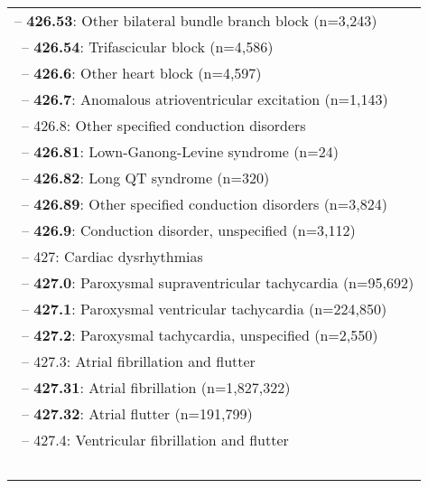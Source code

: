 \begin{longtable}{p{\textwidth}}
\hspace{40pt}\footnotesize{-- {\color{ForestGreen} \textbf{426.53}}: Other bilateral bundle branch block (n=3,243)} \\ \-\ \hspace{40pt}\footnotesize{-- {\color{ForestGreen} \textbf{426.54}}: Trifascicular block (n=4,586)} \\ \-\ \hspace{30pt}\footnotesize{-- {\color{ForestGreen} \textbf{426.6}}: Other heart block (n=4,597)} \\ \-\ \hspace{30pt}\footnotesize{-- {\color{ForestGreen} \textbf{426.7}}: Anomalous atrioventricular excitation (n=1,143)} \\ \-\ \hspace{30pt}\footnotesize{-- 426.8: Other specified conduction disorders} \\ \-\ \hspace{40pt}\footnotesize{-- {\color{ForestGreen} \textbf{426.81}}: Lown-Ganong-Levine syndrome (n=24)} \\ \-\ \hspace{40pt}\footnotesize{-- {\color{ForestGreen} \textbf{426.82}}: Long QT syndrome (n=320)} \\ \-\ \hspace{40pt}\footnotesize{-- {\color{ForestGreen} \textbf{426.89}}: Other specified conduction disorders (n=3,824)} \\ \-\ \hspace{30pt}\footnotesize{-- {\color{ForestGreen} \textbf{426.9}}: Conduction disorder, unspecified (n=3,112)} \\ \-\ \hspace{20pt}\footnotesize{-- 427: Cardiac dysrhythmias} \\ \-\ \hspace{30pt}\footnotesize{-- {\color{ForestGreen} \textbf{427.0}}: Paroxysmal supraventricular tachycardia (n=95,692)} \\ \-\ \hspace{30pt}\footnotesize{-- {\color{ForestGreen} \textbf{427.1}}: Paroxysmal ventricular tachycardia (n=224,850)} \\ \-\ \hspace{30pt}\footnotesize{-- {\color{ForestGreen} \textbf{427.2}}: Paroxysmal tachycardia, unspecified (n=2,550)} \\ \-\ \hspace{30pt}\footnotesize{-- 427.3: Atrial fibrillation and flutter} \\ \-\ \hspace{40pt}\footnotesize{-- {\color{ForestGreen} \textbf{427.31}}: Atrial fibrillation (n=1,827,322)} \\ \-\ \hspace{40pt}\footnotesize{-- {\color{ForestGreen} \textbf{427.32}}: Atrial flutter (n=191,799)} \\ \-\ \hspace{30pt}\footnotesize{-- 427.4: Ventricular fibrillation and flutter} \\ \-\ \hspace{40pt}\footnotesize{-- {\color{ForestGreen} \textbf{427.41}}: Ventricular 
\end{longtable}
